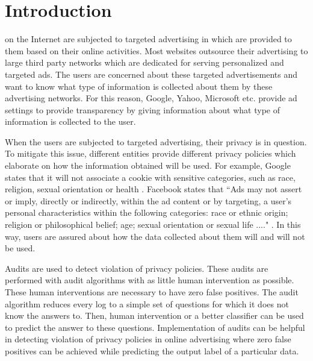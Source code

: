 \documentclass[12pt, journal]{IEEEtran}
\begin{document}
\section{Introduction}
% 
% 
% 
% 
 on the Internet are subjected to targeted advertising in which are provided to them based on their online activities. Most websites outsource their advertising to large third party networks which are dedicated for serving personalized and targeted ads. The users are concerned about these targeted advertisements and want to know what type of information is collected about them by these advertising networks. For this reason, Google, Yahoo, Microsoft etc. provide ad settings to provide transparency by giving information about what type of information is collected to the user. 
 
When the users are subjected to targeted advertising, their privacy is in question. To mitigate this issue, different entities provide different privacy policies which elaborate on how the information obtained will be used. For example, Google states that it will not associate a cookie with sensitive categories, such as race, religion, sexual orientation or health \cite{google}. Facebook states that ``Ads may not assert or imply, directly or indirectly, within the ad content or by targeting, a user's personal characteristics within the following categories: race or ethnic origin; religion or philosophical belief; age; sexual orientation or sexual life ...." \cite{fb}. In this way, users are assured about how the data collected about them will and will not be used.
 
 Audits are used to detect violation of privacy policies. These audits are performed with audit algorithms with as little human intervention as possible. These human interventions are necessary to have zero false positives. The audit algorithm reduces every log to a simple set of questions for which it does not know the answers to. Then, human intervention or a better classifier can be used to predict the answer to these questions. Implementation of audits can be helpful in detecting violation of privacy policies in online advertising where zero false positives can be achieved while predicting the output label of a particular data. 
 
\end{document}
